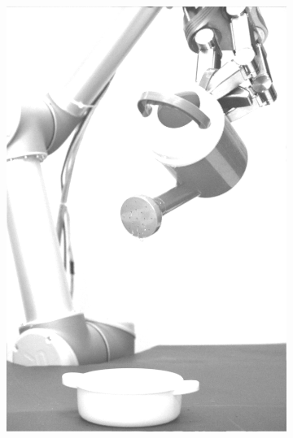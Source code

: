 \begin{figure}[H]
\begin{subfigure}[b]{0.1\textwidth}
        \includegraphics[width=\textwidth]{img3/test/contrast_5_1_4_final_img3.png}
    \end{subfigure}
        \begin{subfigure}[b]{0.1\textwidth}

\end{subfigure}
\end{figure}
